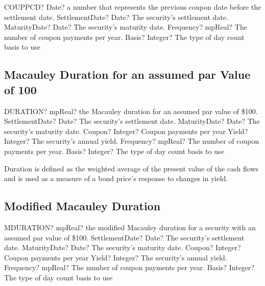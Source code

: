 \begin{mpFunctionsExtract}
	\mpWorksheetFunctionFourNotImplemented
	{COUPPCD? Date? a number that represents the previous coupon date before the settlement date.}
	{SettlementDate? Date? The security's settlement date.}
	{MaturityDate? Date? The security's maturity date.}
	{Frequency? mpReal? The number of coupon payments per year.}
	{Basis? Integer?  The type of day count basis to use}
\end{mpFunctionsExtract}





\subsection{Macauley Duration for an assumed par Value of 100}

\begin{mpFunctionsExtract}
	\mpWorksheetFunctionSixNotImplemented
	{DURATION? mpReal? the Macauley duration for an assumed par value of \$100.}
	{SettlementDate? Date? The security's settlement date.}
	{MaturityDate? Date? The security's maturity date.}
	{Coupon? Integer?  Coupon payments per year}
	{Yield? Integer?  The security's annual yield.}
	{Frequency? mpReal? The number of coupon payments per year.}
	{Basis? Integer?  The type of day count basis to use}
\end{mpFunctionsExtract}

\vspace{0.3cm}
Duration is defined as the weighted average of the present value of the cash flows and is used as a measure of a bond price's response to changes in yield.





\subsection{Modified Macauley Duration}

\begin{mpFunctionsExtract}
	\mpWorksheetFunctionSixNotImplemented
	{MDURATION? mpReal? the modified Macauley duration for a security with an assumed par value of \$100.}
	{SettlementDate? Date? The security's settlement date.}
	{MaturityDate? Date? The security's maturity date.}
	{Coupon? Integer?  Coupon payments per year}
	{Yield? Integer?  The security's annual yield.}
	{Frequency? mpReal? The number of coupon payments per year.}
	{Basis? Integer?  The type of day count basis to use}
\end{mpFunctionsExtract}

